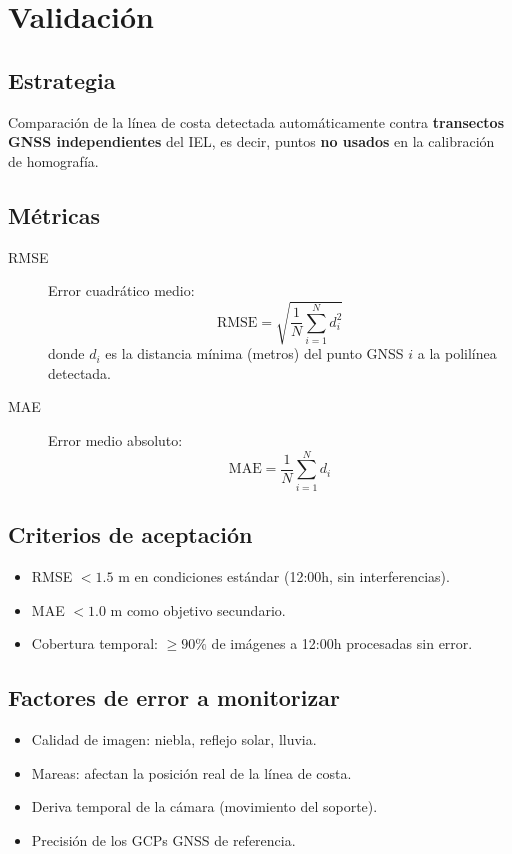\chapter{Validación}

\section{Estrategia}

Comparación de la línea de costa detectada automáticamente contra
\textbf{transectos GNSS independientes} del IEL, es decir, puntos
\textbf{no usados} en la calibración de homografía.

\section{Métricas}

\begin{description}
  \item[RMSE] Error cuadrático medio:
        \[
          \text{RMSE} = \sqrt{\frac{1}{N}\sum_{i=1}^N d_i^2}
        \]
        donde $d_i$ es la distancia mínima (metros) del punto GNSS $i$
        a la polilínea detectada.

  \item[MAE] Error medio absoluto:
        \[
          \text{MAE} = \frac{1}{N}\sum_{i=1}^N d_i
        \]
\end{description}

\section{Criterios de aceptación}

\begin{itemize}
  \item RMSE $< 1.5$ m en condiciones estándar (12:00h, sin interferencias).
  \item MAE $< 1.0$ m como objetivo secundario.
  \item Cobertura temporal: $\geq 90\%$ de imágenes a 12:00h procesadas
        sin error.
\end{itemize}

\section{Factores de error a monitorizar}

\begin{itemize}
  \item Calidad de imagen: niebla, reflejo solar, lluvia.
  \item Mareas: afectan la posición real de la línea de costa.
  \item Deriva temporal de la cámara (movimiento del soporte).
  \item Precisión de los GCPs GNSS de referencia.
\end{itemize}
